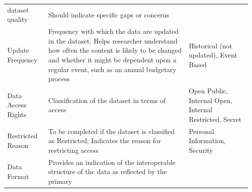 \documentclass[
]{WileySix}
\begin{document}
\begin{longtable}[]{@{}lll@{}}
\begin{minipage}[t]{0.35\columnwidth}
dataset quality\strut
\end{minipage} & \begin{minipage}[t]{0.35\columnwidth}\raggedright
Should indicate specific
gaps or concerns\strut
\end{minipage}\tabularnewline
\begin{minipage}[t]{0.22\columnwidth}\raggedright
Update
Frequency\strut
\end{minipage} & \begin{minipage}[t]{0.35\columnwidth}\raggedright
Frequency with which the
data are updated in the
dataset. Helps researcher
understand how often the
content is likely to be
changed and whether it
might be dependent upon a
regular event, such as an
annual budgetary process\strut
\end{minipage} & \begin{minipage}[t]{0.35\columnwidth}\raggedright
Historical (not updated),
Event Based\strut
\end{minipage}\tabularnewline
\begin{minipage}[t]{0.22\columnwidth}\raggedright
Data Access
Rights\strut
\end{minipage} & \begin{minipage}[t]{0.35\columnwidth}\raggedright
Classification of the
dataset in terms of
access\strut
\end{minipage} & \begin{minipage}[t]{0.35\columnwidth}\raggedright
Open Public, Internal
Open, Internal
Restricted, Secret\strut
\end{minipage}\tabularnewline
\begin{minipage}[t]{0.22\columnwidth}\raggedright
Restricted
Reason\strut
\end{minipage} & \begin{minipage}[t]{0.35\columnwidth}\raggedright
To be completed if the
dataset is classified as
Restricted; Indicates the
reason for restricting
access\strut
\end{minipage} & \begin{minipage}[t]{0.35\columnwidth}\raggedright
Personal Information,
Security\strut
\end{minipage}\tabularnewline
\begin{minipage}[t]{0.22\columnwidth}\raggedright
Data Format\strut
\end{minipage} & \begin{minipage}[t]{0.35\columnwidth}\raggedright
Provides an indication of
the interoperable
structure of the data as
reflected by the primary

\end{minipage}
\end{longtable}
\end{document}
